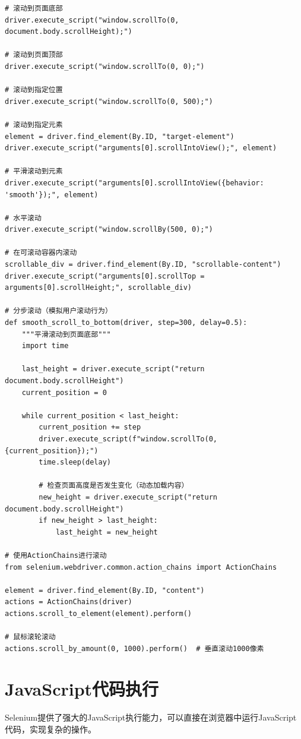 \begin{lstlisting}[style=demostyle,numbers=none]
# 滚动到页面底部
driver.execute_script("window.scrollTo(0, document.body.scrollHeight);")

# 滚动到页面顶部
driver.execute_script("window.scrollTo(0, 0);")

# 滚动到指定位置
driver.execute_script("window.scrollTo(0, 500);")

# 滚动到指定元素
element = driver.find_element(By.ID, "target-element")
driver.execute_script("arguments[0].scrollIntoView();", element)

# 平滑滚动到元素
driver.execute_script("arguments[0].scrollIntoView({behavior: 'smooth'});", element)

# 水平滚动
driver.execute_script("window.scrollBy(500, 0);")

# 在可滚动容器内滚动
scrollable_div = driver.find_element(By.ID, "scrollable-content")
driver.execute_script("arguments[0].scrollTop = arguments[0].scrollHeight;", scrollable_div)

# 分步滚动（模拟用户滚动行为）
def smooth_scroll_to_bottom(driver, step=300, delay=0.5):
    """平滑滚动到页面底部"""
    import time
    
    last_height = driver.execute_script("return document.body.scrollHeight")
    current_position = 0
    
    while current_position < last_height:
        current_position += step
        driver.execute_script(f"window.scrollTo(0, {current_position});")
        time.sleep(delay)
        
        # 检查页面高度是否发生变化（动态加载内容）
        new_height = driver.execute_script("return document.body.scrollHeight")
        if new_height > last_height:
            last_height = new_height

# 使用ActionChains进行滚动
from selenium.webdriver.common.action_chains import ActionChains

element = driver.find_element(By.ID, "content")
actions = ActionChains(driver)
actions.scroll_to_element(element).perform()

# 鼠标滚轮滚动
actions.scroll_by_amount(0, 1000).perform()  # 垂直滚动1000像素
\end{lstlisting}

\section{JavaScript代码执行}

Selenium提供了强大的JavaScript执行能力，可以直接在浏览器中运行JavaScript代码，实现复杂的操作。

